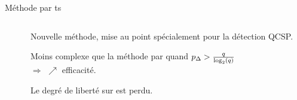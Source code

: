 \documentclass[../main.tex]{subfiles}
\begin{document}
\begin{frame}{Méthode par \acrfull{ts}}{}
\begin{columns}
\begin{column}{.45\linewidth}
\begin{overlayarea}{\linewidth}{.5\textheight}
      \end{overlayarea}
    \end{column}
    \begin{column}{.55\linewidth}
      Nouvelle méthode, mise au point spécialement pour la détection QCSP.
      \begin{ctrlitemize}{0pt}
        \item [\bonus] Moins complexe que la méthode par \fft{} quand \textcolor{red}{$p_\Delta{} > \frac{q}{\log_2(q)}$} \cite{moniereTimeSlidingWindow2021}\\$\Rightarrow$ $\nearrow$ efficacité.
        \item [\malus] Le degré de liberté sur \textcolor{red}{\pd{}} est perdu.
      \end{ctrlitemize}
    \end{column}
  \end{columns}
\end{frame}
\end{document}
